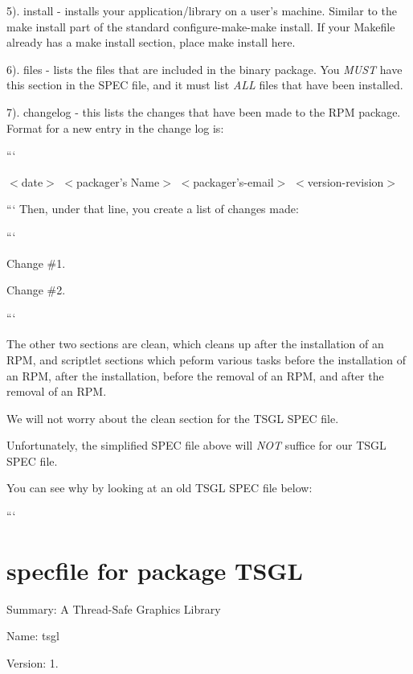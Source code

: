 5). {\ttfamily install} -\/ installs your application/library on a user's machine. Similar to the make install part of the standard configure-\/make-\/make install. If your Makefile already has a make install section, place make install here.

6). {\ttfamily files} -\/ lists the files that are included in the binary package. You {\itshape M\-U\-S\-T} have this section in the S\-P\-E\-C file, and it must list {\itshape A\-L\-L} files that have been installed.

7). {\ttfamily changelog} -\/ this lists the changes that have been made to the R\-P\-M package. Format for a new entry in the change log is\-:

```
\begin{DoxyItemize}
\item $<$date$>$ $<$packager's Name$>$ $<$packager's-\/email$>$ $<$version-\/revision$>$
\end{DoxyItemize}

``` Then, under that line, you create a list of changes made\-:

```
\begin{DoxyItemize}
\item Change \#1.
\item Change \#2.
\end{DoxyItemize}```

The other two sections are {\ttfamily clean}, which cleans up after the installation of an R\-P\-M, and scriptlet sections which peform various tasks before the installation of an R\-P\-M, after the installation, before the removal of an R\-P\-M, and after the removal of an R\-P\-M.

We will not worry about the {\ttfamily clean} section for the T\-S\-G\-L S\-P\-E\-C file.

Unfortunately, the simplified S\-P\-E\-C file above will {\itshape N\-O\-T} suffice for our T\-S\-G\-L S\-P\-E\-C file.

You can see why by looking at an old T\-S\-G\-L S\-P\-E\-C file below\-:

```

\section*{specfile for package T\-S\-G\-L}

Summary\-: A Thread-\/\-Safe Graphics Library

Name\-: tsgl

Version\-: 1.

